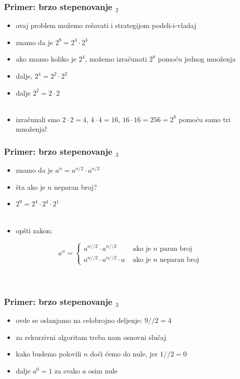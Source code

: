 \documentclass[utf8,compress]{beamer}
\begin{document}
\begin{frame}[fragile]
  \frametitle{Primer: brzo stepenovanje $_2$}
  \begin{itemize}
    \item ovaj problem možemo rešavati i strategijom podeli-i-vladaj
    \item znamo da je $2^8 = 2^4\cdot 2^4$
    \item ako znamo koliko je $2^4$, možemo izračunati $2^8$ pomoću jednog množenja
    \item dalje, $2^4 = 2^2\cdot 2^2$
    \item dalje $2^2 = 2\cdot 2$ \\ \ \\
    \item izračunali smo $2\cdot 2 = 4$, $4\cdot 4 = 16$, $16\cdot 16 = 256 = 2^8$ pomoću samo tri množenja!
  \end{itemize}
\end{frame}

\begin{frame}[fragile]
  \frametitle{Primer: brzo stepenovanje $_3$}
  \begin{itemize}
    \item znamo da je $a^n = a^{n/2}\cdot a^{n/2}$
    \item šta ako je $n$ neparan broj?
    \item $2^9 = 2^4\cdot 2^4\cdot 2^1$ \\ \ \\
    \item opšti zakon:
  \end{itemize}
    $$ a^n = \left\{
      \begin{array}{ll}
        a^{n//2}\cdot a^{n//2} &\mbox{ ako je $n$ paran broj} \\
        a^{n//2}\cdot a^{n//2}\cdot a &\mbox{ ako je $n$ neparan broj}
      \end{array} 
      \right. $$ \\ \ \\
\end{frame}

\begin{frame}[fragile]
  \frametitle{Primer: brzo stepenovanje $_3$}
  \begin{itemize}
    \item ovde se oslanjamo na celobrojno deljenje: $9//2 = 4$
    \item za rekurzivni algoritam treba nam osnovni slučaj
    \item kako budemo polovili $n$ doći ćemo do nule, jer $1//2=0$
    \item dalje $a^0 = 1$ za svako $a$ osim nule
  \end{itemize}
\end{frame}
\end{document}

